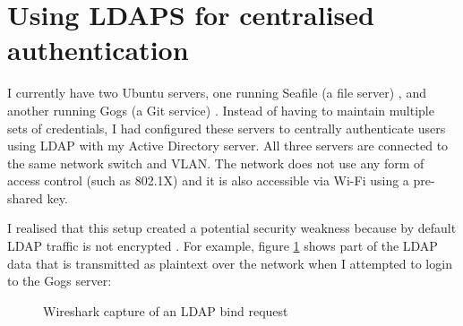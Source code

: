 \documentclass[11pt,a4paper]{scrartcl}
\begin{document}
\newpage

\section*{Using LDAPS for centralised authentication}
\begin{refsection}

I currently have two Ubuntu servers, one running Seafile (a file server) \cite{seafile}, and another running Gogs (a Git service) \cite{gogs}. Instead of having to maintain multiple sets of credentials, I had configured these servers to centrally authenticate users using LDAP with my Active Directory server. All three servers are connected to the same network switch and VLAN. The network does not use any form of access control (such as 802.1X) and it is also accessible via Wi-Fi using a pre-shared key.

I realised that this setup created a potential security weakness because by default LDAP traffic is not encrypted \cite{microsoft_enable_ldaps}. For example, figure \ref{fig:wireshark_ldap} shows part of the LDAP data that is transmitted as plaintext over the network when I attempted to login to the Gogs server:

\begin{figure}[h]
	\centering
	\qquad
	\caption{Wireshark capture of an LDAP bind request}
	\label{fig:wireshark_ldap}
\end{figure}


\end{refsection}
\end{document}
